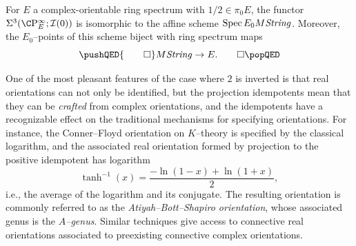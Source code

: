 \begin{corollary}\label{OddPrimaryMStringTriumvirate}
For \(E\) a complex-orientable ring spectrum with \(1/2 \in \pi_0 E\), the functor \(\Sigma^3(\CP^\infty_E; \sheaf I(0))\) is isomorphic to the affine scheme \(\operatorname{Spec} E_0 M\mathit{String}\).
Moreover, the \(E_0\)--points of this scheme biject with ring spectrum maps \[\pushQED{\qed}M\String \to E. \qedhere \popQED\]
\end{corollary}

\begin{remark}
One of the most pleasant features of the case where \(2\) is inverted is that real orientations can not only be identified, but the projection idempotents mean that they can be \emph{crafted} from complex orientations, and the idempotents have a recognizable effect on the traditional mechanisms for specifying orientations.
For instance, the Conner--Floyd orientation on \(K\)--theory is specified by the classical logarithm, and the associated real orientation formed by projection to the positive idempotent has logarithm \[\operatorname{tanh}^{-1}(x) = \frac{-\ln(1 - x) + \ln(1 + x)}{2},\] i.e., the average of the logarithm and its conjugate.
The resulting orientation is commonly referred to as the \textit{Atiyah--Bott--Shapiro orientation}, whose associated genus is the \textit{\(\widehat A\)--genus}.
Similar techniques give access to connective real orientations associated to preexisting connective complex orientations.
\end{remark}

